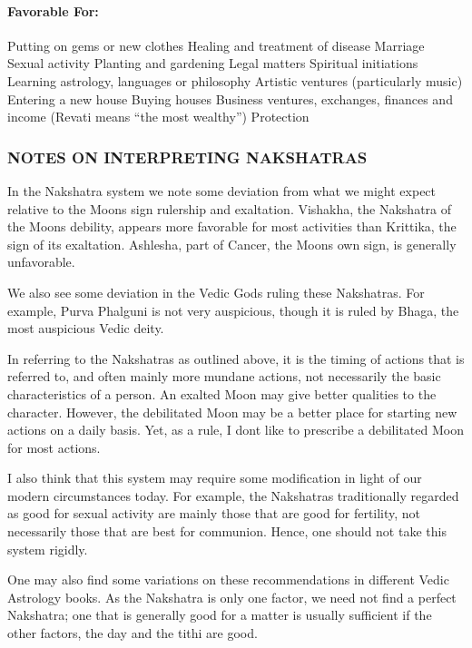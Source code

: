  

\paragraph{Favorable For:}

Putting on gems or new clothes
Healing and treatment of disease
Marriage
Sexual activity
Planting and gardening
Legal matters
Spiritual initiations
Learning astrology, languages or philosophy
Artistic ventures (particularly music)
Entering a new house
Buying houses
Business ventures, exchanges, finances and income (Revati means “the most wealthy”)
Protection
 

\subsubsection{NOTES ON INTERPRETING NAKSHATRAS}

In the Nakshatra system we note some deviation from what we might expect relative to the Moons sign rulership and exaltation. Vishakha, the Nakshatra of the Moons debility, appears more favorable for most activities than Krittika, the sign of its exaltation. Ashlesha, part of Cancer, the Moons own sign, is generally unfavorable.

We also see some deviation in the Vedic Gods ruling these Nakshatras. For example, Purva Phalguni is not very auspicious, though it is ruled by Bhaga, the most auspicious Vedic deity.

In referring to the Nakshatras as outlined above, it is the timing of actions that is referred to, and often mainly more mundane actions, not necessarily the basic characteristics of a person. An exalted Moon may give better qualities to the character. However, the debilitated Moon may be a better place for starting new actions on a daily basis. Yet, as a rule, I dont like to prescribe a debilitated Moon for most actions.

I also think that this system may require some modification in light of our modern circumstances today. For example, the Nakshatras traditionally regarded as good for sexual activity are mainly those that are good for fertility, not necessarily those that are best for communion. Hence, one should not take this system rigidly.

One may also find some variations on these recommendations in different Vedic Astrology books. As the Nakshatra is only one factor, we need not find a perfect Nakshatra; one that is generally good for a matter is usually sufficient if the other factors, the day and the tithi are good.

